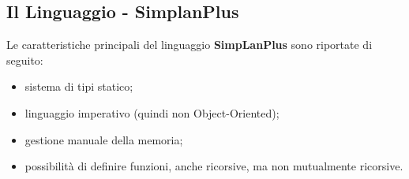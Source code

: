 \documentclass[../../main]{subfiles}
\begin{document}
\subsection{Il Linguaggio - SimplanPlus}
Le caratteristiche principali del linguaggio \textbf{SimpLanPlus} sono riportate di seguito:
\begin{itemize}
    \item sistema di tipi statico;
    \item linguaggio imperativo (quindi non Object-Oriented);
    \item gestione manuale della memoria;
    \item possibilità di definire funzioni, anche ricorsive, ma non mutualmente ricorsive.
\end{itemize}
\end{document}
